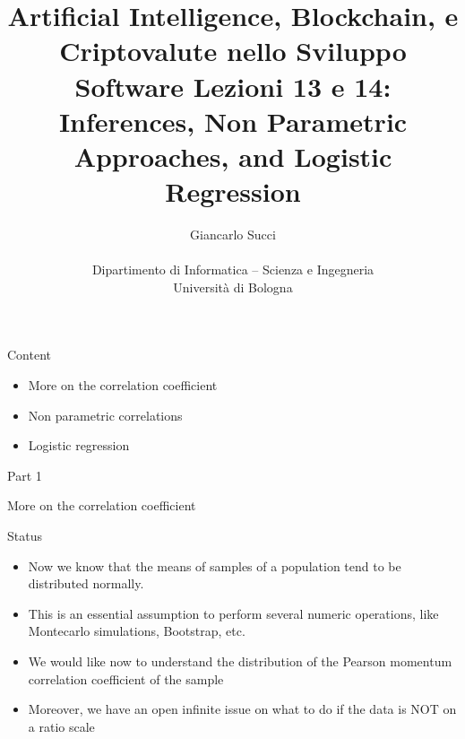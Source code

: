 \documentclass{beamer}
\title[L01]{Artificial Intelligence, Blockchain, e Criptovalute nello Sviluppo Software \newline\newline
Lezioni 13 e 14: Inferences, Non Parametric Approaches, and Logistic Regression} %
\author[{\tiny Giancarlo Succi }]{Giancarlo Succi\\\\ Dipartimento di Informatica -- Scienza e Ingegneria\\Universit\`{a} di Bologna\\
\bftt{g.succi@unibo.it}
} %
\institute[unibo] %
\date{} %
\begin{document}
\begin{frame}
\titlepage %

\end{frame}



\begin{frame}
{\centerline{Content}}

\begin{itemize}
\item More on the correlation coefficient
\item Non parametric correlations
\item Logistic regression
\end{itemize}
\end{frame}


\begin{frame}
{\centerline{Part 1}}

\begin{center}
\Huge More on the correlation coefficient
\end{center}
\end{frame}


\begin{frame}
{\centerline{Status}}

\begin{itemize}
\item Now we know that the means of samples of a population tend to be distributed normally.
\item This is an essential assumption to perform several numeric operations, like Montecarlo simulations, Bootstrap, etc.
\item We would like now to understand the distribution of the Pearson momentum correlation coefficient of the sample
\item Moreover, we have an open infinite issue on what to do if the data is NOT on a ratio scale
\end{itemize}


\end{frame}
\end{document}
